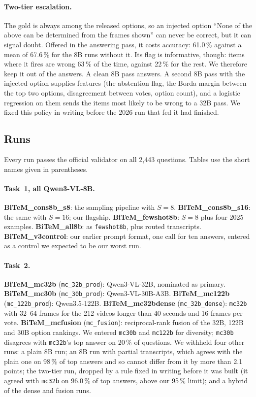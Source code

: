 \documentclass[sigconf,nonacm]{acmart}
\newcommand{\run}[1]{\mbox{\textbf{#1}}}   %
\begin{document}
\paragraph{Two-tier escalation.}
The gold is always among the released options, so an injected option ``None of
the above can be determined from the frames shown'' can never be correct, but it
can signal doubt. Offered in the answering pass, it costs accuracy: 61.0\,\%
against a mean of 67.6\,\% for the 8B runs without it. Its flag is informative,
though: items where it fires are wrong 63\,\% of the time, against 22\,\% for the
rest. We therefore keep it out of the answers. A clean 8B pass answers. A second
8B pass with the injected option supplies features (the abstention flag, the
Borda margin between the top two options, disagreement between votes, option
count), and a logistic regression on them sends the items most likely to be wrong
to a 32B pass. We fixed this policy in writing before the 2026 run that fed it
had finished.

\subsection{Runs}
\label{sec:runs}

Every run passes the official validator on all 2,443 questions. Tables use the
short names given in parentheses.

\paragraph{Task~1, all Qwen3-VL-8B\@.}
\run{BiTeM\_cons8b\_s8}: the sampling pipeline with $S=8$.
\run{BiTeM\_cons8b\_s16}: the same with $S=16$; our flagship.
\run{BiTeM\_fewshot8b}: $S=8$ plus four 2025 examples. \run{BiTeM\_all8b}: as
\texttt{fewshot8b}, plus routed transcripts. \run{BiTeM\_v3control}: our earlier
prompt format, one call for ten answers, entered as a control we expected to be
our worst run.

\paragraph{Task~2.}
\run{BiTeM\_mc32b} (\texttt{mc\_32b\_prod}): Qwen3-VL-32B, nominated as primary.
\run{BiTeM\_mc30b} (\texttt{mc\_30b\_prod}): Qwen3-VL-30B-A3B.
\run{BiTeM\_mc122b} (\texttt{mc\_122b\_prod}): Qwen3.5-122B.
\run{BiTeM\_mc32bdense} (\texttt{mc\_32b\_dense}): \texttt{mc32b} with 32--64
frames for the 212 videos longer than 40 seconds and 16 frames per vote.
\run{BiTeM\_mcfusion} (\texttt{mc\_fusion}): reciprocal-rank fusion of the 32B,
122B and 30B option rankings. We entered \texttt{mc30b} and \texttt{mc122b} for
diversity; \texttt{mc30b} disagrees with \texttt{mc32b}'s top answer on 20\,\% of
questions. We withheld four other runs: a plain 8B run; an 8B run with partial
transcripts, which agrees with the plain one on 98\,\% of top answers and so
cannot differ from it by more than 2.1 points; the two-tier run, dropped by a
rule fixed in writing before it was built (it agreed with \texttt{mc32b} on
96.0\,\% of top answers, above our 95\,\% limit); and a hybrid of the dense and
fusion runs.
\end{document}
